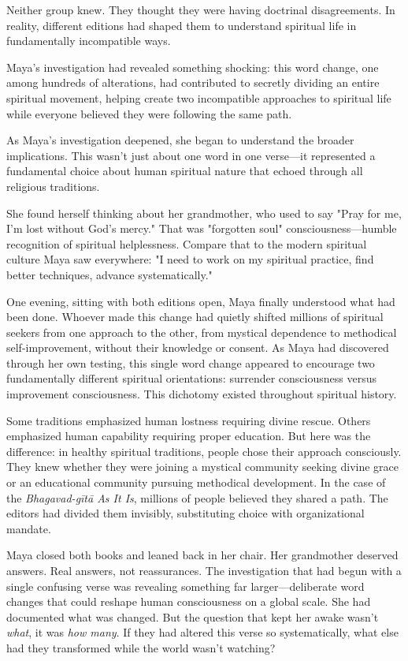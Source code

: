 \documentclass[12pt,twoside]{book}
\begin{document}
Neither group knew. They thought they were having doctrinal disagreements. In reality, different editions had shaped them to understand spiritual life in fundamentally incompatible ways.

Maya's investigation had revealed something shocking: this word change, one among hundreds of alterations, had contributed to secretly dividing an entire spiritual movement, helping create two incompatible approaches to spiritual life while everyone believed they were following the same path.

As Maya's investigation deepened, she began to understand the broader implications. This wasn't just about one word in one verse—it represented a fundamental choice about human spiritual nature that echoed through all religious traditions.

She found herself thinking about her grandmother, who used to say "Pray for me, I'm lost without God's mercy." That was "forgotten soul" consciousness—humble recognition of spiritual helplessness. Compare that to the modern spiritual culture Maya saw everywhere: "I need to work on my spiritual practice, find better techniques, advance systematically."

One evening, sitting with both editions open, Maya finally understood what had been done. Whoever made this change had quietly shifted millions of spiritual seekers from one approach to the other, from mystical dependence to methodical self-improvement, without their knowledge or consent. As Maya had discovered through her own testing, this single word change appeared to encourage two fundamentally different spiritual orientations: surrender consciousness versus improvement consciousness. This dichotomy existed throughout spiritual history.

Some traditions emphasized human lostness requiring divine rescue. Others emphasized human capability requiring proper education. But here was the difference: in healthy spiritual traditions, people chose their approach consciously. They knew whether they were joining a mystical community seeking divine grace or an educational community pursuing methodical development. In the case of the \emph{Bhagavad-gītā As It Is}, millions of people believed they shared a path. The editors had divided them invisibly, substituting choice with organizational mandate.

Maya closed both books and leaned back in her chair. Her grandmother deserved answers. Real answers, not reassurances. The investigation that had begun with a single confusing verse was revealing something far larger—deliberate word changes that could reshape human consciousness on a global scale. She had documented what was changed. But the question that kept her awake wasn't \emph{what}, it was \emph{how many}. If they had altered this verse so systematically, what else had they transformed while the world wasn't watching?
\end{document}
